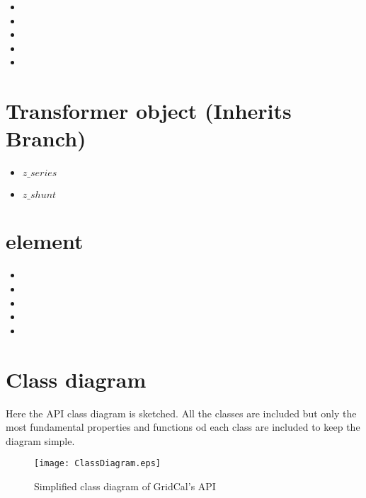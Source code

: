 \documentclass[11pt,fleqn]{book} %
\begin{document}
\begin{itemize}
	\item 
	\item 
	\item 
	\item 
	\item 
\end{itemize}


\section{Transformer object (Inherits Branch)}

\begin{itemize}
	\item $z\_series$
	\item $z\_shunt$
\end{itemize}











\section{element}

\begin{itemize}
	\item 
	\item 
	\item 
	\item 
	\item 
\end{itemize}


\section{Class diagram}

Here the API class diagram is sketched. All the classes are included but only the most fundamental properties and functions od each class are included to keep the diagram simple.

\begin{figure}[h]
	\centering
	\texttt{[image: ClassDiagram.eps]}
	\caption{Simplified class diagram of GridCal's API}
	\label{fig:ClassDiagram}
\end{figure}

\end{document}
